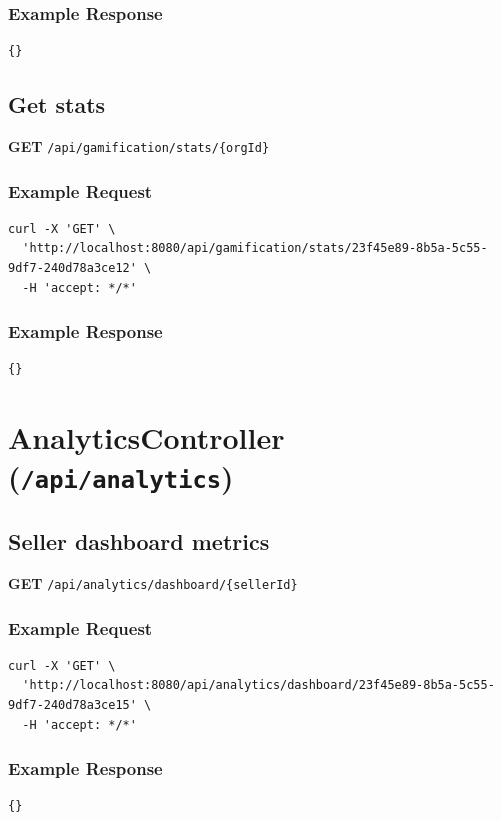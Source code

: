 \documentclass[a4paper,11pt]{article}
\begin{document}
\subsubsection*{Example Response}
\begin{lstlisting}
{}
\end{lstlisting}

\subsection{Get stats}
\textbf{GET} \texttt{/api/gamification/stats/\{orgId\}}
\subsubsection*{Example Request}
\begin{lstlisting}
curl -X 'GET' \
  'http://localhost:8080/api/gamification/stats/23f45e89-8b5a-5c55-9df7-240d78a3ce12' \
  -H 'accept: */*'
\end{lstlisting}

\subsubsection*{Example Response}
\begin{lstlisting}
{}
\end{lstlisting}

\section{AnalyticsController (\texttt{/api/analytics})}

\subsection{Seller dashboard metrics}
\textbf{GET} \texttt{/api/analytics/dashboard/\{sellerId\}}
\subsubsection*{Example Request}
\begin{lstlisting}
curl -X 'GET' \
  'http://localhost:8080/api/analytics/dashboard/23f45e89-8b5a-5c55-9df7-240d78a3ce15' \
  -H 'accept: */*'
\end{lstlisting}

\subsubsection*{Example Response}
\begin{lstlisting}
{}
\end{lstlisting}
\end{document}
